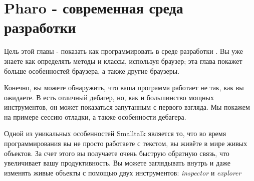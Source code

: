 \documentclass[a4paper,10pt,twoside]{book}
\begin{document}
	\sloppy
\fi
\chapter{Pharo - современная среда разработки}


Цель этой главы - показать как программировать в среде разработки  \pharo.
Вы уже знаете как определять методы и классы, используя браузер; эта глава покажет больше особенностей браузера, а также другие браузеры.


Конечно, вы можете обнаружить, что ваша программа работает не так, как вы ожидаете. В \pharo есть отличный дебагер, но, как и большинство мощных инструментов, он может показаться запутанным с первого взгляда. Мы покажем на примере сессию отладки, а также особенности дебагера.


Одной из уникальных особенностей Smalltalk является то, что во время программирования вы не просто работаете с текстом, вы живёте в мире живых объектов. За счет этого вы получаете очень быструю обратную связь, что увеличивает вашу продуктивность. Вы можете  заглядывать внутрь и даже изменять живые объекты с помощью двух инструментов: \emph{inspector} и \emph{explorer}
\end{document}
